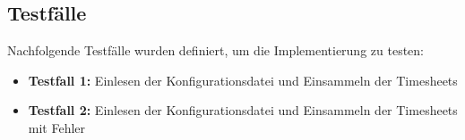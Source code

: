 \subsection{Testfälle}
Nachfolgende Testfälle wurden definiert, um die Implementierung zu testen:
\begin{itemize}
\item \textbf{Testfall 1:} Einlesen der Konfigurationsdatei und Einsammeln der Timesheets
\item \textbf{Testfall 2:} Einlesen der Konfigurationsdatei und Einsammeln der Timesheets mit Fehler
\end{itemize}